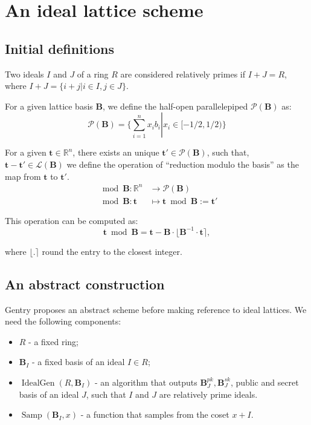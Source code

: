\chapter{An ideal lattice scheme}
\label{appendixA}
\section{Initial definitions}

\begin{definition}
Two ideals $I$ and $J$ of a ring $R$ are considered relatively primes if $I+J=R$, where $I+J=\{i+j|i\in I,j\in J\}$.
\end{definition}

\begin{definition}
For a given lattice basis $\mathbf B$, we define the half-open parallelepiped $\mathcal P (\mathbf B)$ as:
$$\mathcal P (\mathbf B)=\Big\{\sum_{i=1}^{n}x_ib_i\left|\right. x_i\in [-1/2,1/2)\Big\}$$
\end{definition}

\begin{proposition}
For a given $\mathbf t \in\mathbb{R}^n$, there exists an unique $\mathbf t'\in\mathcal P(\mathbf B)$, such that, $\mathbf t-\mathbf t' \in\mathcal L(\mathbf B)$ we define the operation of ``reduction modulo the basis'' as the map from $\mathbf t$ to $\mathbf t'$.
\begin{align*}
    \mod \mathbf B:\mathbb{R}^n&\to\mathcal P(\mathbf B)\\
    \mod \mathbf B:\mathbf t &\mapsto \mathbf t \bmod \mathbf B := \mathbf t'
\end{align*}

This operation can be computed as:
$$\mathbf t\bmod \mathbf B=\mathbf t-\mathbf B\cdot\lfloor{\mathbf B}^{-1}\cdot\mathbf t\rceil,$$

where $\lfloor.\rceil$ round the entry to the closest integer. \cite{stan16}
\end{proposition}

\section{An abstract construction}
Gentry \cite{gentry2009fully} proposes an abstract scheme before making reference to ideal lattices. We need the following components:

\begin{itemize}
    \item $R$ - a fixed ring;
    \item $\mathbf B_I$ - a fixed basis of an ideal $I\in R$;
    \item $\operatorname{IdealGen}(R,\mathbf B_I)$ - an algorithm that outputs $\mathbf B_{J}^{pk},\mathbf B_{J}^{sk}$, public and secret basis of an ideal $J$, such that $I$ and $J$ are relatively prime ideals.
    \item $\operatorname{Samp}(\mathbf B_I,x)$ - a function that samples from the coset $x+I$.
\end{itemize}

